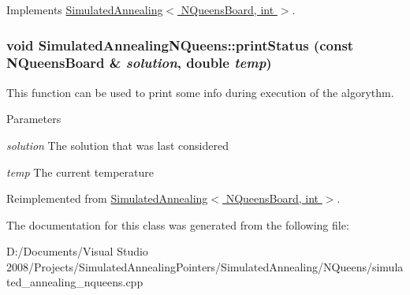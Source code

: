 Implements \hyperlink{class_simulated_annealing_a71b64ea8dca2d5bba7fb6d4b6cde1c81}{SimulatedAnnealing$<$ NQueensBoard, int $>$}.\hypertarget{class_simulated_annealing_n_queens_a8165b39087c35fa62127c7f392e25d8b}{
\subsubsection[{printStatus}]{\setlength{\rightskip}{0pt plus 5cm}void SimulatedAnnealingNQueens::printStatus (const {\bf NQueensBoard} \& {\em solution}, \/  double {\em temp})}}
\label{class_simulated_annealing_n_queens_a8165b39087c35fa62127c7f392e25d8b}
This function can be used to print some info during execution of the algorythm. 
\begin{DoxyParams}{Parameters}
\item[{\em solution}]The solution that was last considered \item[{\em temp}]The current temperature \end{DoxyParams}


Reimplemented from \hyperlink{class_simulated_annealing_accc3e21d0c77ac87ce604f17e014c11d}{SimulatedAnnealing$<$ NQueensBoard, int $>$}.

The documentation for this class was generated from the following file:\begin{DoxyCompactItemize}
\item 
D:/Documents/Visual Studio 2008/Projects/SimulatedAnnealingPointers/SimulatedAnnealing/NQueens/simulated\_\-annealing\_\-nqueens.cpp\end{DoxyCompactItemize}

